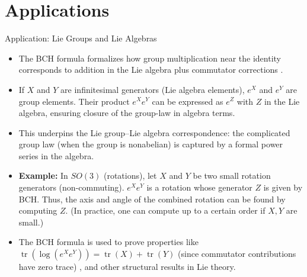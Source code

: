 \documentclass{beamer}
\begin{document}
\section{Applications}
\begin{frame}{Application: Lie Groups and Lie Algebras}
\begin{itemize}
\item The BCH formula formalizes how group multiplication near the identity corresponds to addition in the Lie algebra plus commutator corrections .
\item If $X$ and $Y$ are infinitesimal generators (Lie algebra elements), $e^X$ and $e^Y$ are group elements. Their product $e^X e^Y$ can be expressed as $e^Z$ with $Z$ in the Lie algebra, ensuring closure of the group-law in algebra terms.
\item This underpins the Lie group–Lie algebra correspondence: the complicated group law (when the group is nonabelian) is captured by a formal power series in the algebra.
\item \textbf{Example:} In $SO(3)$ (rotations), let $X$ and $Y$ be two small rotation generators (non-commuting). $e^X e^Y$ is a rotation whose generator $Z$ is given by BCH. Thus, the axis and angle of the combined rotation can be found by computing $Z$. (In practice, one can compute up to a certain order if $X, Y$ are small.)
\item The BCH formula is used to prove properties like $\operatorname{tr}(\log(e^X e^Y)) = \operatorname{tr}(X) + \operatorname{tr}(Y)$ (since commutator contributions have zero trace) , and other structural results in Lie theory.
\end{itemize}
\end{frame}
\end{document}
